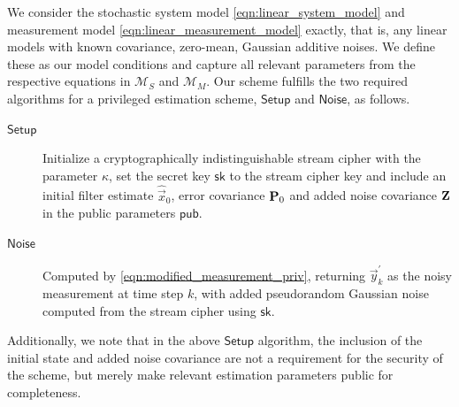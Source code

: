 We consider the stochastic system model \eqref{eqn:linear_system_model} and measurement model \eqref{eqn:linear_measurement_model} exactly, that is, any linear models with known covariance, zero-mean, Gaussian additive noises. We define these as our model conditions and capture all relevant parameters from the respective equations in $\mathcal{M}_S$ and $\mathcal{M}_M$. Our scheme fulfills the two required algorithms for a privileged estimation scheme, $\mathsf{Setup}$ and $\mathsf{Noise}$, as follows.
\begin{description}
   \item[$\mathsf{Setup}$] Initialize a cryptographically indistinguishable stream cipher with the parameter $\kappa$, set the secret key $\mathsf{sk}$ to the stream cipher key and include an initial filter estimate $\hat{\vec{x}}_0$, error covariance ${{\mathbf{P}}}_0$ and added noise covariance ${{\mathbf{Z}}}$ in the public parameters $\mathsf{pub}$.
   \item[$\mathsf{Noise}$] Computed by \eqref{eqn:modified_measurement_priv}, returning $\vec{y}^\prime_k$ as the noisy measurement at time step $k$, with added pseudorandom Gaussian noise computed from the stream cipher using $\mathsf{sk}$.
\end{description}
Additionally, we note that in the above $\mathsf{Setup}$ algorithm, the inclusion of the initial state and added noise covariance are not a requirement for the security of the scheme, but merely make relevant estimation parameters public for completeness.


